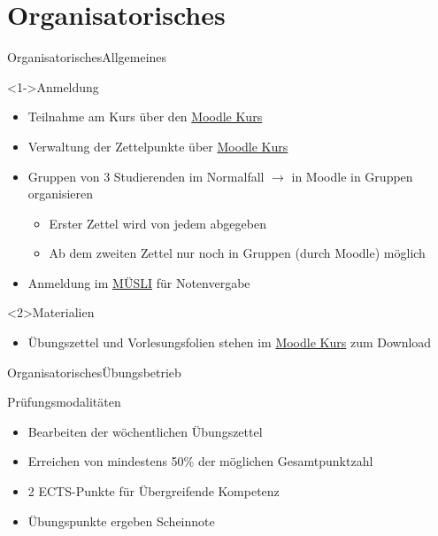 \documentclass[
	vorläufig=false,
	datum=2021-10-20,
	titel={Einführung und grundlegende Bedienung},
	web=true,
	max,
	aspectratio=1610,
]{../tex/latexkurs-slides}
\begin{document}
\section{Organisatorisches}

\begin{frame}[t]{Organisatorisches}{Allgemeines}
	\begin{block}<1->{Anmeldung}
		\begin{itemize}
            \item Teilnahme am Kurs über den \href{https://moodle.uni-heidelberg.de/course/view.php?id=9677}{Moodle Kurs}  
			\item Verwaltung der Zettelpunkte über \href{https://moodle.uni-heidelberg.de/course/view.php?id=9677}{Moodle Kurs}
            \item Gruppen von 3 Studierenden im Normalfall \(\rightarrow\) in Moodle in Gruppen organisieren
            \begin{itemize}
                \item Erster Zettel wird von jedem abgegeben
                \item Ab dem zweiten Zettel nur noch in Gruppen (durch Moodle) möglich
            \end{itemize}
            \item Anmeldung im \href{https://muesli.mathi.uni-heidelberg.de/lecture/view/1451}{MÜSLI} für Notenvergabe
        \end{itemize}
	\end{block}
	\begin{block}{Materialien}
		\begin{itemize}
			\item Übungszettel und Vorlesungsfolien stehen im \href{https://moodle.uni-heidelberg.de/course/view.php?id=9677}{Moodle Kurs} zum Download
		\end{itemize}
	\end{block}
\end{frame}

\begin{frame}[t]{Organisatorisches}{Übungsbetrieb}
	\begin{block}{Prüfungsmodalitäten}
		\begin{itemize}
			\item Bearbeiten der wöchentlichen Übungszettel
			\item Erreichen von mindestens 50\% der möglichen Gesamtpunktzahl
			\item 2 ECTS-Punkte für Übergreifende Kompetenz
			\item Übungspunkte ergeben Scheinnote
		\end{itemize}
	\end{block}
\end{frame}
\end{document}
